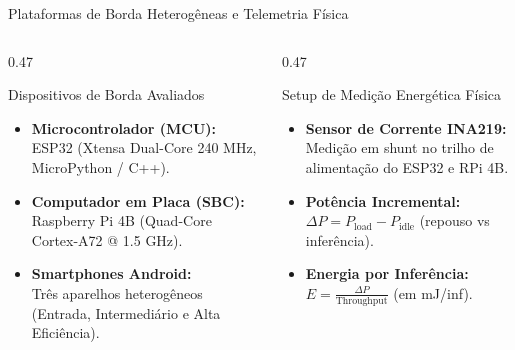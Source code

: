 \documentclass[aspectratio=169,10pt]{beamer}
\begin{document}
\begin{frame}{Plataformas de Borda Heterogêneas e Telemetria Física}
  \begin{columns}[T,onlytextwidth]
    \begin{column}{0.47\linewidth}
      \begin{block}{Dispositivos de Borda Avaliados}
        \footnotesize
        \begin{itemize}
          \item \textbf{Microcontrolador (MCU):}\\
          ESP32 (Xtensa Dual-Core 240 MHz, MicroPython / C++).
          \vspace{0.06cm}
          \item \textbf{Computador em Placa (SBC):}\\
          Raspberry Pi 4B (Quad-Core Cortex-A72 @ 1.5 GHz).
          \vspace{0.06cm}
          \item \textbf{Smartphones Android:}\\
          Três aparelhos heterogêneos (Entrada, Intermediário e Alta Eficiência).
        \end{itemize}
      \end{block}
    \end{column}
    \hfill
    \begin{column}{0.47\linewidth}
      \begin{alertblock}{Setup de Medição Energética Física}
        \footnotesize
        \begin{itemize}
          \item \textbf{Sensor de Corrente INA219:}\\
          Medição em shunt no trilho de alimentação do ESP32 e RPi 4B.
          \vspace{0.06cm}
          \item \textbf{Potência Incremental:}\\
          $\Delta P = P_{\text{load}} - P_{\text{idle}}$ (repouso vs inferência).
          \vspace{0.06cm}
          \item \textbf{Energia por Inferência:}\\
          $E = \frac{\Delta P}{\text{Throughput}}$ (em mJ/inf).
        \end{itemize}
      \end{alertblock}
    \end{column}
  \end{columns}
\end{frame}
\end{document}

